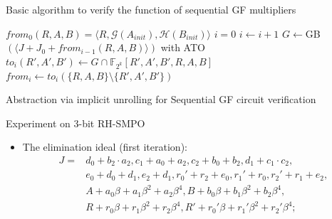 \documentclass[xcolor=dvipsnames]{beamer}
\newcommand{\bi}{\begin{itemize}}
\newcommand{\ei}{\end{itemize}}
\begin{document}
\begin{frame}{\large{Basic algorithm to verify the function of sequential GF multipliers}}
\begin{algorithm}[H] %
\SetAlgoNoLine

  $from_0(R,A,B) = \langle R, \mathcal{G}(A_{init}), \mathcal{H}(B_{init})\rangle$\;
  $i = 0$\;
  {
  	$i \gets i + 1$\;
	\alert{$G \gets$GB$( \langle J + J_0+ from_{i-1}(R,A,B) \rangle)$ with ATO}\;
	$to_i(R',A',B')\gets G\cap \mathbb F_{2^k}[R',A',B',R,A,B]$\;
	$from_i \gets to_i(\{R,A,B\}\setminus \{R',A',B'\})$\;
  }
\caption {Abstraction via implicit unrolling for Sequential GF circuit verification}
\end{algorithm}
\end{frame}
\begin{frame}{\large{Experiment on 3-bit RH-SMPO}}
\begin{figure}[hbt]
\end{figure}
\vspace{-0.2in}
\bi
\item The elimination ideal (first iteration):
\begin{align*}
J = &d_0+b_2\cdot a_2,
c_1+a_0+a_2,
c_2+b_0+b_2,
d_1+c_1\cdot c_2,\\
&e_0+d_0+d_1,
e_2+d_1,
r_0'+r_2+e_0,
r_1'+r_0,
r_2'+r_1+e_2,\\
&A+a_0\beta+a_1\beta^2+a_2\beta^4,
B+b_0\beta+b_1\beta^2+b_2\beta^4,\\
&R+r_0\beta+r_1\beta^2+r_2\beta^4,
R'+r_0'\beta+r_1'\beta^2+r_2'\beta^4;
\end{align*}
\ei
\end{frame}
\end{document}

